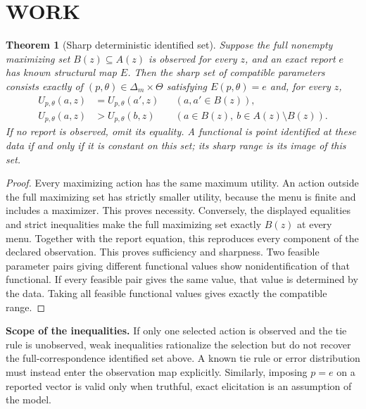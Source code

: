 \documentclass[11pt,a4paper]{article}
\newtheorem{theorem}{Theorem}[section]
\theoremstyle{definition}\newtheorem{definition}[theorem]{Definition}
\theoremstyle{remark}\newtheorem{remark}[theorem]{Remark}
\newcommand{\1}{\mathbf 1}
\begin{document}
\section{WORK}
\begin{theorem}[Sharp deterministic identified set]\label{thm:fiber}
Suppose the full nonempty maximizing set $B(z)\subseteq A(z)$ is observed for every $z$, and an exact report $e$ has known structural map $E$. Then the sharp set of compatible parameters consists exactly of $(p,\theta)\in\Delta_m\times\Theta$ satisfying $E(p,\theta)=e$ and, for every $z$,
\[
 \begin{aligned}
 U_{p,\theta}(a,z)&=U_{p,\theta}(a',z)
       &&(a,a'\in B(z)),\\
 U_{p,\theta}(a,z)&>U_{p,\theta}(b,z)
       &&(a\in B(z),\ b\in A(z)\setminus B(z)).
 \end{aligned}
\]
If no report is observed, omit its equality. A functional is point identified at these data if and only if it is constant on this set; its sharp range is its image of this set.
\end{theorem}
\begin{proof}
Every maximizing action has the same maximum utility. An action outside the full maximizing set has strictly smaller utility, because the menu is finite and includes a maximizer. This proves necessity. Conversely, the displayed equalities and strict inequalities make the full maximizing set exactly $B(z)$ at every menu. Together with the report equation, this reproduces every component of the declared observation. This proves sufficiency and sharpness. Two feasible parameter pairs giving different functional values show nonidentification of that functional. If every feasible pair gives the same value, that value is determined by the data. Taking all feasible functional values gives exactly the compatible range.
\end{proof}

\textbf{Scope of the inequalities.} If only one selected action is observed and the tie rule is unobserved, weak inequalities rationalize the selection but do not recover the full-correspondence identified set above. A known tie rule or error distribution must instead enter the observation map explicitly. Similarly, imposing $p=e$ on a reported vector is valid only when truthful, exact elicitation is an assumption of the model.
\end{document}

